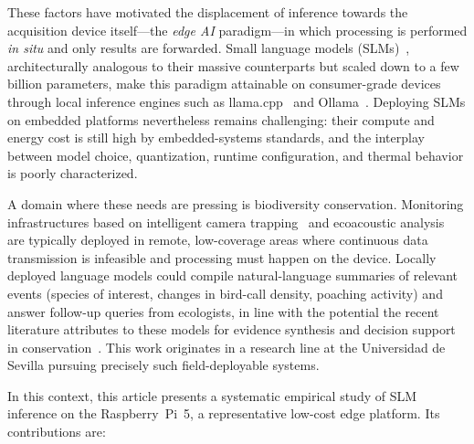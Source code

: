 \documentclass[acmsmall,natbib=false]{acmart}
\begin{document}
These factors have motivated the displacement of inference towards the
acquisition device itself---the \emph{edge AI} paradigm---in which processing
is performed \emph{in situ} and only results are forwarded. Small language
models (SLMs)~\cite{kamath_llms_2024}, architecturally analogous to their
massive counterparts but scaled down to a few billion parameters, make this
paradigm attainable on consumer-grade devices through local inference engines
such as llama.cpp~\cite{gerganov_llamacpp_2023} and
Ollama~\cite{ollama_2023}. Deploying SLMs on embedded platforms nevertheless
remains challenging: their compute and energy cost is still high by
embedded-systems standards, and the interplay between model choice,
quantization, runtime configuration, and thermal behavior is poorly
characterized.

A domain where these needs are pressing is biodiversity conservation.
Monitoring infrastructures based on intelligent camera
trapping~\cite{velasco-montero_case_2022} and ecoacoustic
analysis~\cite{velasco-montero_-site_2026} are typically deployed in remote,
low-coverage areas where continuous data transmission is infeasible and
processing must happen on the device. Locally deployed language models could
compile natural-language summaries of relevant events (species of interest,
changes in bird-call density, poaching activity) and answer follow-up queries
from ecologists, in line with the potential the recent literature attributes
to these models for evidence synthesis and decision support in
conservation~\cite{reynolds_potential_2025,miao_new_2026}. This work
originates in a research line at the Universidad de Sevilla pursuing precisely
such field-deployable systems.

In this context, this article presents a systematic empirical study of SLM
inference on the Raspberry~Pi~5, a representative low-cost edge platform. Its
contributions are:
\end{document}
